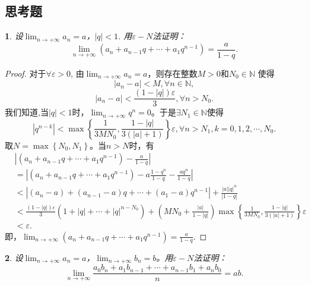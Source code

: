 \documentclass[utf8]{book}
\newtheorem{example}{}[section]             %
\begin{document}
\subsection{思考题}
\begin{example}
设$\displaystyle \lim_{n\to +\infty}a_n = a$，$\left |q \right | < 1$. 用$\varepsilon-N$法证明：
$$\displaystyle \lim_{n\to +\infty}(a_n + a_{n-1}q + \cdots + a_1q^{n-1}) = \frac{a}{1-q}.$$
\end{example}
\begin{proof}

对于$\forall \varepsilon > 0$, 由$\displaystyle \lim_{n\to +\infty}a_n = a$，则存在整数$M > 0$和$N_0 \in \mathbb{N}$ 使得
$$\left | a_n - a \right | < M, \forall n\in\mathbb{N},$$
$$\left | a_n - a \right | < \frac{(1-|q|)\varepsilon}{3}, \forall n > N_0.$$
我们知道,当$\left| q\right| < 1$时，$\displaystyle \lim_{n\to +\infty}q^n = 0$。于是$\exists N_1 \in \mathbb {N}$使得
$$\left|q^{n-k}\right| < \max\left \{\frac{1}{3MN_0}, \frac{1-|q|}{3(|a|+1)}\right\}\varepsilon, \forall n > N_1, k=0, 1, 2, \cdots, N_0.$$
取$N = \max\left\{N_0, N_1\right\}$。当$n > N$时，有
\begin{equation*}
\begin{split}
&\left | (a_n + a_{n-1}q + \cdots + a_1q^{n-1}) - \frac{a}{1-q} \right | \\
&= \left | (a_n + a_{n-1}q + \cdots + a_1q^{n-1}) - a\frac{1-q^n}{1-q} - \frac{aq^n}{1-q}\right|\\
&< \left | (a_n - a) + (a_{n-1} - a)q + \cdots + (a_1- a)q^{n-1} \right | + \frac{\left|a\right|\left|q\right|^n}{\left|1-q\right|} \\
&<\frac{(1-|q|)\varepsilon}{3}(1 + |q| + \cdots + |q|^{n-N_0}) + \left(MN_0+\frac{|a|}{1-|q|}\right)\max\left \{\frac{1}{3MN_0}, \frac{1-|q|}{3(|a|+1)}\right\}
\varepsilon\\&< \varepsilon.
	\end{split}
\end{equation*}
即，$\displaystyle \lim_{n\to +\infty}(a_n + a_{n-1}q + \cdots + a_1q^{n-1}) = \frac{a}{1-q}.$ 

\end{proof}
\begin{example}
设$\displaystyle \lim_{n\to +\infty}a_n = a$，$\displaystyle \lim_{n\to +\infty}b_n = b$。用$\varepsilon-N$法证明：
$$\displaystyle \lim_{n\to +\infty}\frac{a_0b_n+a_1b_{n-1}+\cdots+a_{n-1}b_1+a_nb_0}{n}= ab.$$
\end{example}
\end{document}
